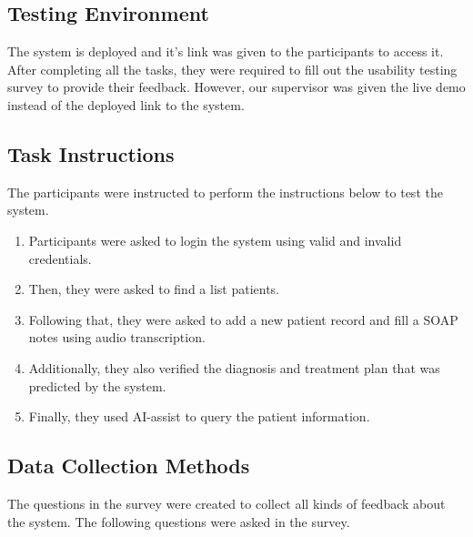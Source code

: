\documentclass{article}
\begin{document}
\subsection{Testing Environment}

The system is deployed and it's link was given to the participants to access it. After completing all the tasks, they were required to fill out the usability testing survey to provide their feedback. However, our supervisor was given the live demo instead of the deployed link to the system.

\subsection{Task Instructions}

The participants were instructed to perform the instructions below to test the system.

\begin{enumerate}
    \item Participants were asked to login the system using valid and invalid credentials.
    \item Then, they were asked to find a list patients.
    \item Following that, they were asked to add a new patient record and fill a SOAP notes using audio transcription.
    \item Additionally, they also verified the diagnosis and treatment plan that was predicted by the system.
    \item Finally, they used AI-assist to query the patient information.
\end{enumerate}

\subsection{Data Collection Methods}

The questions in the survey were created to collect all kinds of feedback about the system. The following questions were asked in the survey.
\end{document}
